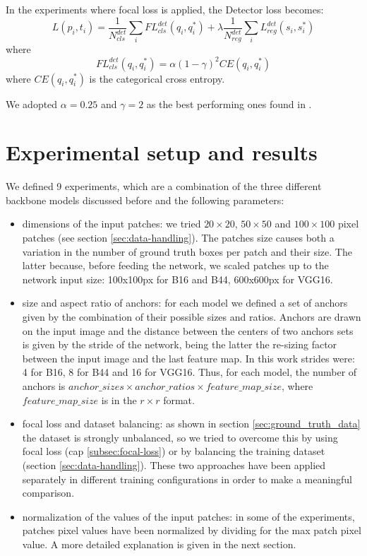 \documentclass[a4paper,10pt]{report}
\begin{document}
In the experiments where focal loss is applied, the Detector loss becomes:
\[L({p_i}, {t_i}) = \dfrac{1}{N_{cls}^{det}} \sum_{i} FL_{cls}^{det}(q_i, q_i^*) + \lambda \dfrac{1}{N_{reg}^{det}} \sum_{i}L_{reg}^{det}(s_i, s_i^*) \]
where
\[FL_{cls}^{det}(q_i, q_i^*) = \alpha (1-\gamma)^2 CE(q_i, q_i^*)\]
where $CE(q_i, q_i^*)$ is the categorical cross entropy. 

We adopted $\alpha=0.25$ and $\gamma=2$ as the best performing ones found in \cite{focal-loss}.

\chapter{Experimental setup and results}\label{chap:experiments}
 We defined 9 experiments, which are a combination of the three different backbone models discussed before and the following parameters:

\begin{itemize}
    \item dimensions of the input patches: we tried $20 \times 20$, $50 \times 50$ and $100 \times 100$ pixel patches (see section \ref{sec:data-handling}). The patches size causes both a variation in the number of ground truth boxes per patch and their size. The latter because, before feeding the network, we scaled patches up to the network input size: 100x100px for B16 and B44, 600x600px for VGG16.
    \item size and aspect ratio of anchors: for each model we defined a set of anchors given by the combination of their possible sizes and ratios. Anchors are drawn on the input image and the distance between the centers of two anchors sets is given by the stride of the network, being the latter the re-sizing factor between the input image and the last feature map. In this work strides were: 4 for B16, 8 for B44 and 16 for VGG16. Thus, for each model, the number of anchors is $anchor\_sizes \times anchor\_ratios \times feature\_map\_size$, where $feature\_map\_size$ is in the $r \times r$ format.
    \item focal loss and dataset balancing: as shown in section \ref{sec:ground_truth_data} the dataset is strongly unbalanced, so we tried to overcome this by using focal loss (cap \ref{subsec:focal-loss}) or by balancing the training dataset (section \ref{sec:data-handling}). These two approaches have been applied separately in different training configurations in order to make a meaningful comparison.  
    \item normalization of the values of the input patches: in some of the experiments, patches pixel values have been normalized by dividing for the max patch pixel value. A more detailed explanation is given in the next section.
\end{itemize}
\end{document}
